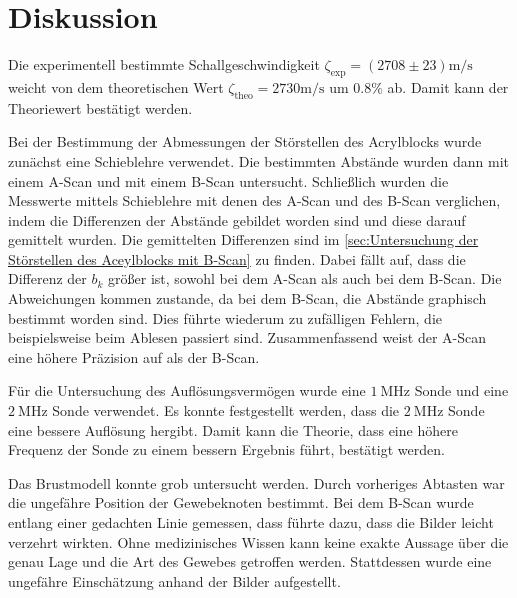 \section{Diskussion}
\label{sec:diskussion}

Die experimentell bestimmte Schallgeschwindigkeit $\zeta_{\text{exp}} = \left(2708 \pm 23\right) \si{\meter \per \second}$ weicht von dem 
theoretischen Wert $\zeta_{\text{theo}} = 2730 \si{\meter \per \second}$ um $0.8 \%$ ab. Damit kann der Theoriewert bestätigt werden.

Bei der Bestimmung der Abmessungen der Störstellen des Acrylblocks wurde zunächst eine Schieblehre verwendet. Die bestimmten Abstände
wurden dann mit einem A-Scan und mit einem B-Scan untersucht. Schließlich wurden die Messwerte mittels Schieblehre mit denen des A-Scan und des 
B-Scan verglichen, indem die Differenzen der Abstände gebildet worden sind und diese darauf gemittelt wurden. Die gemittelten Differenzen 
sind im \autoref{sec:Untersuchung der Störstellen des Aceylblocks mit B-Scan} zu finden.
Dabei fällt auf, dass die Differenz der $b_k$ größer ist, sowohl bei dem A-Scan als auch bei dem B-Scan.
Die Abweichungen kommen zustande, da bei dem B-Scan, die Abstände graphisch bestimmt worden sind. Dies führte wiederum zu zufälligen Fehlern, die beispielsweise
beim Ablesen passiert sind. Zusammenfassend weist der A-Scan eine höhere Präzision auf als der B-Scan.

Für die Untersuchung des Auflösungsvermögen wurde eine $\SI{1}{\mega\hertz}$ Sonde und eine $\SI{2}{\mega\hertz}$ Sonde verwendet. 
Es konnte festgestellt werden, dass die $\SI{2}{\mega\hertz}$ Sonde eine bessere Auflösung hergibt.
Damit kann die Theorie, dass eine höhere Frequenz der Sonde zu einem bessern Ergebnis führt, bestätigt werden.

Das Brustmodell konnte grob untersucht werden. Durch vorheriges Abtasten war die ungefähre Position der Gewebeknoten bestimmt.
Bei dem B-Scan wurde entlang einer gedachten Linie gemessen, dass führte dazu, dass die Bilder leicht verzehrt wirkten. Ohne medizinisches Wissen 
kann keine exakte Aussage über die genau Lage und die Art des Gewebes getroffen werden. Stattdessen wurde eine ungefähre Einschätzung anhand der Bilder 
aufgestellt.

